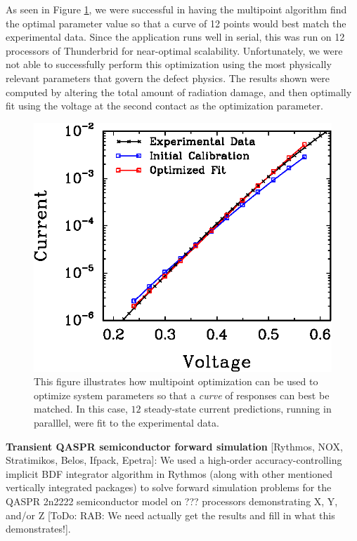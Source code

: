\documentclass[pdf,ps2pdf,11pt]{SANDreport}
\begin{document}
As seen in Figure {}\ref{fig:multiPointFit}, we were successful in having
the multipoint algorithm find the optimal parameter value so that a curve
of 12 points would best match the experimental data. Since the application 
runs well in serial, this was run on 12 processors of Thunderbrid for 
near-optimal scalability. Unfortunately, we were not able to successfully 
perform this optimization using the most physically relevant
parameters that govern the defect physics. The results shown were computed
by altering the total amount of radiation damage, and then optimally
fit using the voltage at the second contact as the optimization parameter.
{\bsinglespace
\begin{figure}
\begin{center}
\includegraphics*[angle=0,scale=1.00
]{multiPointFit}
\end{center}
\caption{
\label{fig:multiPointFit}
This figure illustrates how multipoint optimization can be used to optimize
system parameters so that a {\em curve} of responses can best be matched. In this case,
$12$ steady-state current predictions, running in paralllel, were fit to the
experimental data. }
\end{figure}
\esinglespace}

{}\noindent\textbf{Transient QASPR semiconductor forward simulation} [Rythmos,
NOX, Stratimikos, Belos, Ifpack, Epetra]: We used a high-order
accuracy-controlling implicit BDF integrator algorithm in Rythmos (along with
other mentioned vertically integrated packages) to solve forward simulation
problems for the QASPR 2n2222 semiconductor model on ??? processors
demonstrating X, Y, and/or Z [ToDo: RAB: We need actually get the results and
fill in what this demonstrates!].
 
\end{document}
